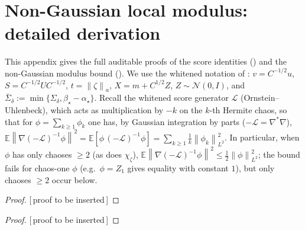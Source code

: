 \documentclass[11pt]{article}
\theoremstyle{plain}
\theoremstyle{definition}
\theoremstyle{remark}
\newcommand{\N}{\mathcal{N}}
\newcommand{\E}{\mathbb{E}}
\newcommand{\Id}{I}
\newcommand{\norm}[1]{\left\lVert #1\right\rVert}
\newcommand{\PROOFHOLE}{{\color{red}\textsf{[\,proof to be inserted\,]}}}
\begin{document}
\section{Non-Gaussian local modulus: detailed derivation}
\label{app:Kng}

This appendix gives the full auditable proofs of the score identities () and
the non-Gaussian modulus bound (). We use the whitened notation of :
$v=C^{-1/2}u$, $S=C^{-1/2}UC^{-1/2}$, $t=\norm\zeta_a$, $X=m+C^{1/2}Z$, $Z\sim\N(0,\Id)$, and
$\bar\Sigma_\delta:=\min\{\Sigma_\delta,\beta_\star-\alpha_\star\}$. Recall the whitened score
generator $\mathcal L$ (Ornstein--Uhlenbeck), which acts as multiplication by $-k$ on the $k$-th
Hermite chaos, so that for $\phi=\sum_{k\geq1}\phi_k$ one has, by Gaussian integration by parts
($-\mathcal L=\nabla^*\nabla$),
$\E\norm{\nabla(-\mathcal L)^{-1}\phi}^2=\E[\phi\,(-\mathcal L)^{-1}\phi]=\sum_{k\geq1}\tfrac1k\norm{\phi_k}_{L^2}^2$.
In particular, when $\phi$ has only chaoses $\geq2$ (as does $\chi_\zeta$),
$\E\norm{\nabla(-\mathcal L)^{-1}\phi}^2\leq\tfrac12\norm\phi_{L^2}^2$; the bound fails for chaos-one
$\phi$ (e.g.\ $\phi=Z_1$ gives equality with constant $1$), but only chaoses $\geq2$ occur below.

\begin{proof}
\PROOFHOLE
\end{proof}

\begin{proof}
\PROOFHOLE
\end{proof}



\end{document}
